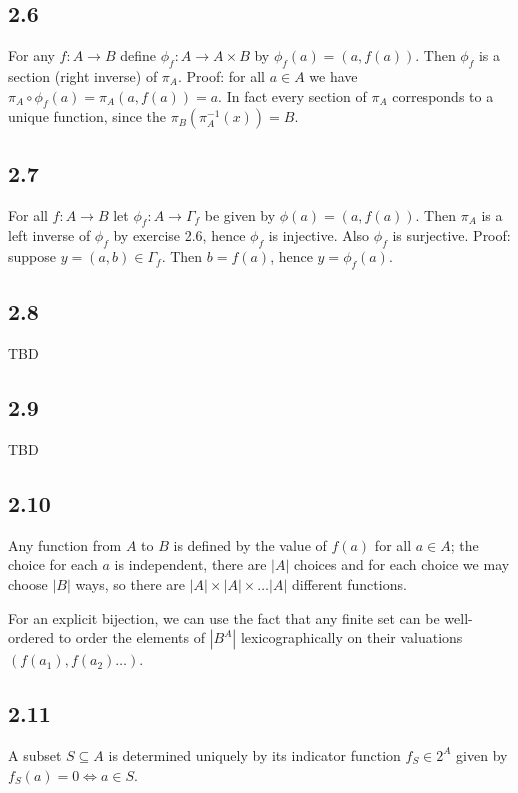 \documentclass{article}
\begin{document}
\subsection*{2.6}

For any $f: A \to B$ define $\phi_f: A \to A \times B$ by $\phi_f(a) = (a, f(a))$. Then $\phi_f$ is a section (right inverse) of $\pi_A$. Proof: for all $a \in A$ we have $\pi_A \circ \phi_f (a) = \pi_A (a, f(a)) = a$. In fact every section of $\pi_A$ corresponds to a unique function, since the $\pi_B(\pi_A^{-1}(x)) = B$.

\subsection*{2.7}

For all $f: A \to B$ let $\phi_f: A \to \Gamma_f$ be given by $\phi(a) = (a, f(a))$. Then $\pi_A$ is a left inverse of $\phi_f$ by exercise 2.6, hence $\phi_f$ is injective. Also $\phi_f$ is surjective. Proof: suppose $y = (a, b) \in \Gamma_f$. Then $b = f(a)$, hence $y = \phi_f(a)$.

\subsection*{2.8}

TBD

\subsection*{2.9}

TBD

\subsection*{2.10}

Any function from $A$ to $B$ is defined by the value of $f(a)$ for all $a \in A$; the choice for each $a$ is independent, there are $|A|$ choices and for each choice we may choose $|B|$ ways, so there are $|A| \times |A| \times \ldots |A|$ different functions.

For an explicit bijection, we can use the fact that any finite set can be well-ordered to order the elements of $|B^A|$ lexicographically on their valuations $(f(a_1), f(a_2) \ldots )$.

\subsection*{2.11}

A subset $S \subseteq A$ is determined uniquely by its indicator function $f_S \in 2^A$ given by $f_S(a) = 0 \iff a \in S$.
\end{document}
